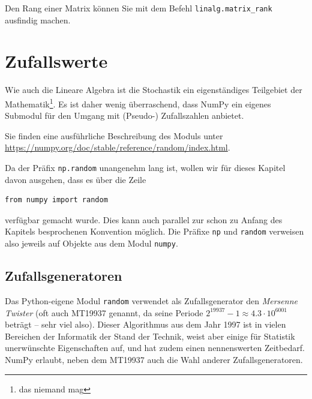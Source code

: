 Den Rang einer Matrix können Sie mit dem Befehl \texttt{linalg.matrix\_rank} ausfindig machen.

\section{Zufallswerte}
\label{sec:NumPy-Random}
Wie auch die Lineare Algebra ist die Stochastik ein eigenständiges Teilgebiet der Mathematik\footnote{das niemand mag}. Es ist daher wenig überraschend, dass NumPy ein eigenes Submodul für den Umgang mit (Pseudo-) Zufallszahlen anbietet.

Sie finden eine ausführliche Beschreibung des Moduls unter \url{https://numpy.org/doc/stable/reference/random/index.html}.

Da der Präfix \texttt{np.random} unangenehm lang ist, wollen wir für dieses Kapitel davon ausgehen, dass es über die Zeile
\begin{codebox}
\begin{verbatim}
from numpy import random
\end{verbatim}
\end{codebox}
verfügbar gemacht wurde. Dies kann auch parallel zur schon zu Anfang des Kapitels besprochenen Konvention  möglich. Die Präfixe \texttt{np} und \texttt{random} verweisen also jeweils auf Objekte aus dem Modul \texttt{numpy}.


\subsection{Zufallsgeneratoren}
Das Python-eigene Modul \texttt{random} verwendet als Zufallsgenerator den \emph{Mersenne Twister} (oft auch MT19937 genannt, da seine Periode 
$2^{19937}-1 \approx 4.3 \cdot 10^{6001}$ beträgt -- sehr viel also). Dieser Algorithmus aus dem Jahr 1997 ist in vielen Bereichen der Informatik der Stand der Technik, weist aber einige für Statistik unerwünschte Eigenschaften auf, und hat zudem einen nennenswerten Zeitbedarf. NumPy erlaubt, neben dem MT19937 auch die Wahl anderer Zufallsgeneratoren.

